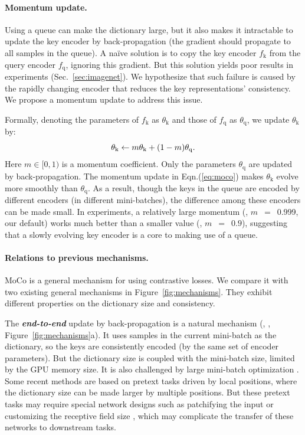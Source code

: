 \documentclass[10pt,twocolumn,letterpaper]{article}
\begin{document}
\paragraph{Momentum update.} Using a queue can make the dictionary large, but it also makes it intractable to update the key encoder by back-propagation (the gradient should propagate to all samples in the queue). A na\"ive solution is to copy the key encoder $f_\textrm{k}$ from the query encoder $f_\textrm{q}$, ignoring this gradient. But this solution yields poor results in experiments (Sec.~\ref{sec:imagenet}). We hypothesize that such failure is caused by the rapidly changing encoder that reduces the key representations' consistency. We propose a momentum update to address this issue.

Formally, denoting the parameters of $f_\textrm{k}$ as $\theta_\textrm{k}$ and those of $f_\textrm{q}$ as $\theta_\textrm{q}$, we update $\theta_\textrm{k}$ by:
\begin{equation}
\small
\theta_\textrm{k} \leftarrow m \theta_\textrm{k} + (1 - m) \theta_\textrm{q}.
\label{eq:moco}
\end{equation}
Here $m\in [0, 1)$ is a momentum coefficient. Only the parameters $\theta_\textrm{q}$ are updated by back-propagation. The momentum update in Eqn.(\ref{eq:moco}) makes $\theta_\textrm{k}$ evolve more smoothly than $\theta_\textrm{q}$. As a result, though the keys in the queue are encoded by different encoders (in different mini-batches), the difference among these encoders can be made small.
In experiments, a relatively large momentum (\eg, \mbox{$m$ $=$ 0.999}, our default) works much better than a smaller value (\eg, \mbox{$m$ $=$ $0.9$}), suggesting that a slowly evolving key encoder is a core to making use of a queue. 

\paragraph{Relations to previous mechanisms.} MoCo is a general mechanism for using contrastive losses. We compare it with two existing general mechanisms in Figure~\ref{fig:mechanisms}.
They exhibit different properties on the dictionary size and consistency.

The \textbf{\emph{end-to-end}} update by back-propagation is a natural mechanism 
(\eg, \cite{Hadsell2006,Oord2018,Hjelm2019,Ye2019,Bachman2019,Henaff2019}, Figure~\ref{fig:mechanisms}a). It uses samples in the current mini-batch as the dictionary, so the keys are consistently encoded (by the same set of encoder parameters).
But the dictionary size is coupled with the mini-batch size, limited by the GPU memory size. It is also challenged by large mini-batch optimization \cite{Goyal2017}.
Some recent methods \cite{Oord2018,Hjelm2019,Bachman2019} are based on pretext tasks driven by local positions, where the dictionary size can be made larger by multiple positions. But these pretext tasks may require special network designs such as patchifying the input \cite{Oord2018} or customizing the receptive field size \cite{Bachman2019}, which may complicate the transfer of these networks to downstream tasks.
\end{document}
